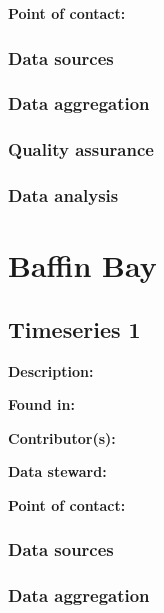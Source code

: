 \documentclass[
]{book}
\begin{document}
\textbf{Point of contact:}

\hypertarget{data-sources}{%
\subsection{Data sources}\label{data-sources}}

\hypertarget{data-aggregation}{%
\subsection{Data aggregation}\label{data-aggregation}}

\hypertarget{quality-assurance}{%
\subsection{Quality assurance}\label{quality-assurance}}

\hypertarget{data-analysis}{%
\subsection{Data analysis}\label{data-analysis}}

\hypertarget{baffin-bay}{%
\chapter{Baffin Bay}\label{baffin-bay}}

\hypertarget{timeseries-1-1}{%
\section{Timeseries 1}\label{timeseries-1-1}}

\textbf{Description:}

\textbf{Found in:}

\textbf{Contributor(s):}

\textbf{Data steward:}

\textbf{Point of contact:}

\hypertarget{data-sources-1}{%
\subsection{Data sources}\label{data-sources-1}}

\hypertarget{data-aggregation-1}{%
\subsection{Data aggregation}\label{data-aggregation-1}}
\end{document}
